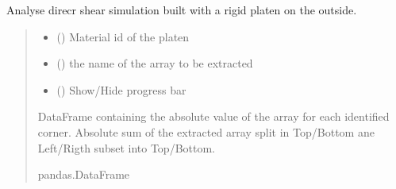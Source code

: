 \documentclass[letterpaper,10pt,english]{sphinxmanual}
\begin{document}
\begin{fulllineitems}
\begin{fulllineitems}
\label{\detokenize{pyfdempp:pyfdempp.pyfdempp.Model.direct_shear_calculation}}
\pysigstartsignatures
{}
\pysigstopsignatures
\sphinxAtStartPar
Analyse direcr shear simulation built with a rigid platen on the outside.
\begin{quote}\begin{description}
\begin{itemize}
\item {} 
\sphinxAtStartPar
{} () \textendash{} Material id of the platen

\item {} 
\sphinxAtStartPar
{} () \textendash{} the name of the array to be extracted

\item {} 
\sphinxAtStartPar
{} () \textendash{} Show/Hide progress bar

\end{itemize}

\sphinxAtStartPar
DataFrame containing the absolute value of the array for each identified corner. Absolute sum of the extracted array split in Top/Bottom ane Left/Rigth sub\sphinxhyphen{}set into Top/Bottom.

\sphinxAtStartPar
pandas.DataFrame

\end{description}\end{quote}


\end{fulllineitems}
\end{fulllineitems}
\end{document}
